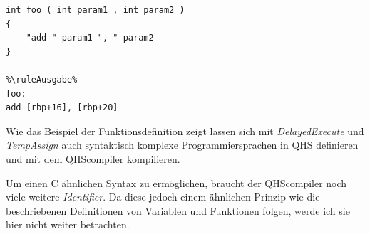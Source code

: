 \begin{lstlisting}[language=QHS, caption=Finale Definition einer Funktion in QHS]
%\ruleEingabe%
int foo ( int param1 , int param2 )
{
    "add " param1 ", " param2
}

%\ruleAusgabe%
foo:
add [rbp+16], [rbp+20]
\end{lstlisting}

Wie das Beispiel der Funktionsdefinition zeigt lassen sich mit \textit{DelayedExecute} und \textit{TempAssign} auch syntaktisch komplexe Programmiersprachen in QHS definieren und mit dem QHScompiler kompilieren.

Um einen C ähnlichen Syntax zu ermöglichen, braucht der QHScompiler noch viele weitere \textit{Identifier}.
Da diese jedoch einem ähnlichen Prinzip wie die beschriebenen Definitionen von Variablen und Funktionen folgen, werde ich sie hier nicht weiter betrachten.


    






